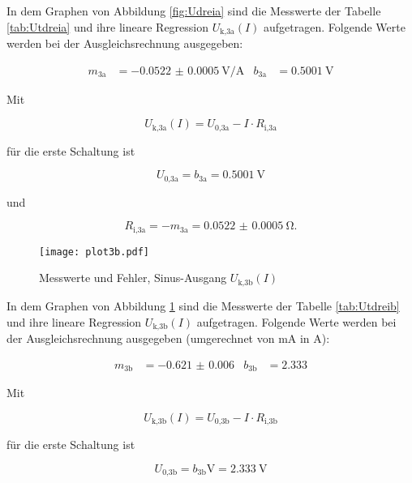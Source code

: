   In dem Graphen von Abbildung \ref{fig:Udreia} sind die Messwerte der Tabelle
  \ref{tab:Utdreia} und ihre lineare Regression
  $U_\text{k,3a}(I)$ aufgetragen.
  Folgende Werte werden bei der Ausgleichsrechnung ausgegeben:

  \begin{align}
    m_\text{3a} & = \SI{-0.0522(5)}{\V\per\A} & b_\text{3a} & = \SI{0.5001}{\V}
  \end{align}

  Mit

  \begin{equation}
    U_\text{k,3a}(I) = U_\text{0,3a} - I \cdot R_\text{i,3a}
  \end{equation}

  für die erste Schaltung ist

  \begin{equation}
    U_\text{0,3a} = b_\text{3a} = \SI{0.5001}{\V}
  \end{equation}

  und

  \begin{equation}
    R_\text{i,3a} = -m_\text{3a} = \SI{0.0522(5)}{\ohm}.
  \end{equation}

  \newpage

  \begin{figure}[h]
    \centering
    \texttt{[image: plot3b.pdf]}
    \caption{Messwerte und Fehler, Sinus-Ausgang $U_\text{k,3b}(I)$}
    \label{fig:Udreib}
  \end{figure}

  In dem Graphen von Abbildung \ref{fig:Udreib} sind die Messwerte der Tabelle
  \ref{tab:Utdreib} und ihre lineare Regression
  $U_\text{k,3b}(I)$ aufgetragen.
  Folgende Werte werden bei der Ausgleichsrechnung ausgegeben (umgerechnet von
  \si{\milli\A} in \si{\A}):

  \begin{align}
    m_\text{3b} & = \num{-0.621(6)} & b_\text{3b} & = 2.333
  \end{align}

  Mit

  \begin{equation}
    U_\text{k,3b}(I) = U_\text{0,3b} - I \cdot R_\text{i,3b}
  \end{equation}

  für die erste Schaltung ist

  \begin{equation}
    U_\text{0,3b} = b_\text{3b} \si{\V} = \SI{2.333}{\V}
  \end{equation}

